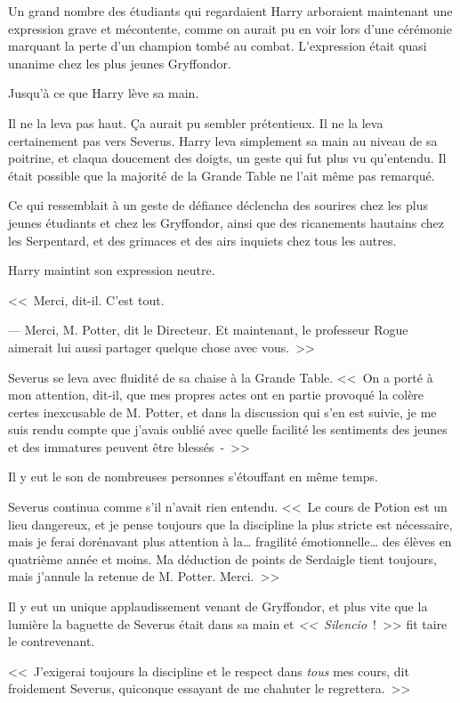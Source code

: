 Un grand nombre des étudiants qui regardaient Harry arboraient maintenant une expression grave et mécontente, comme on aurait pu en voir lors d'une cérémonie marquant la perte d'un champion tombé au combat. L'expression était quasi unanime chez les plus jeunes Gryffondor.

Jusqu'à ce que Harry lève sa main.

Il ne la leva pas haut. Ça aurait pu sembler prétentieux. Il ne la leva certainement pas vers Severus. Harry leva simplement sa main au niveau de sa poitrine, et claqua doucement des doigts, un geste qui fut plus vu qu'entendu. Il était possible que la majorité de la Grande Table ne l'ait même pas remarqué.

Ce qui ressemblait à un geste de défiance déclencha des sourires chez les plus jeunes étudiants et chez les Gryffondor, ainsi que des ricanements hautains chez les Serpentard, et des grimaces et des airs inquiets chez tous les autres.

Harry maintint son expression neutre.

<<~Merci, dit-il. C'est tout.

--- Merci, M. Potter, dit le Directeur. Et maintenant, le professeur Rogue aimerait lui aussi partager quelque chose avec vous.~>>

Severus se leva avec fluidité de sa chaise à la Grande Table. <<~On a porté à mon attention, dit-il, que mes propres actes ont en partie provoqué la colère certes inexcusable de M. Potter, et dans la discussion qui s'en est suivie, je me suis rendu compte que j'avais oublié avec quelle facilité les sentiments des jeunes et des immatures peuvent être blessés~-~>>

Il y eut le son de nombreuses personnes s'étouffant en même temps.

Severus continua comme s'il n'avait rien entendu. <<~Le cours de Potion est un lieu dangereux, et je pense toujours que la discipline la plus stricte est nécessaire, mais je ferai dorénavant plus attention à la… fragilité émotionnelle… des élèves en quatrième année et moins. Ma déduction de points de Serdaigle tient toujours, mais j'annule la retenue de M. Potter. Merci.~>>

Il y eut un unique applaudissement venant de Gryffondor, et plus vite que la lumière la baguette de Severus était dans sa main et \emph{<<~Silencio}~!~>> fit taire le contrevenant.

<<~J'exigerai toujours la discipline et le respect dans \emph{tous} mes cours, dit froidement Severus, quiconque essayant de me chahuter le regrettera.~>>

